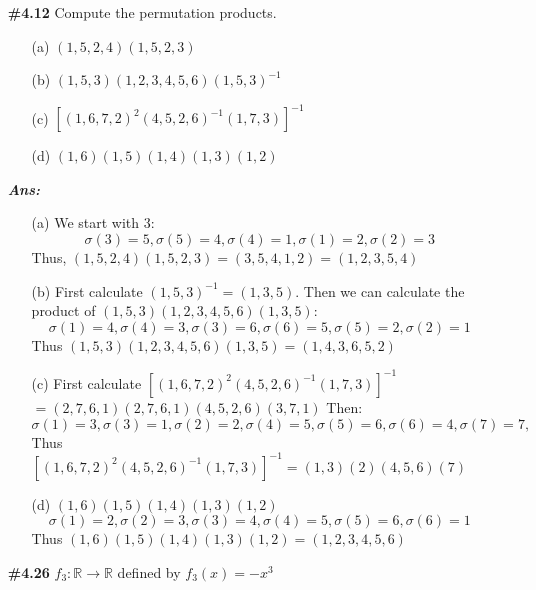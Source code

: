 \documentclass[12pt]{article}
\newcommand{\sol}{\setlength{\parindent}{0cm}\textbf{\textit{Ans:}}\setlength{\parindent}{1cm} }
\begin{document}
\begin{enumerate}[start=1,label={\bfseries Question \arabic*:},leftmargin=1in] %
  \item[\textbf{\#4.12}] Compute the permutation products.
  \begin{enumerate}
      \item[(a)] \( (1, 5, 2, 4)(1, 5, 2, 3) \)
      \item[(b)] \( (1, 5, 3)(1, 2, 3, 4, 5, 6)(1, 5, 3)^{-1} \)
      \item[(c)] \( [(1, 6, 7, 2)^2 (4, 5, 2, 6)^{-1} (1, 7, 3)]^{-1} \)
      \item[(d)] \( (1, 6)(1, 5)(1, 4)(1, 3)(1, 2) \)
  \end{enumerate}
  \sol{}
  \begin{enumerate}
    \item[(a)] We start with 3:
    \[\sigma(3) = 5, 
      \sigma(5) = 4, 
      \sigma(4) = 1, 
      \sigma(1) = 2, 
      \sigma(2) = 3
    \]
    Thus, \( (1, 5, 2, 4)(1, 5, 2, 3) = (3, 5, 4, 1, 2) = (1, 2, 3, 5, 4) \)
    \item[(b)] First calculate \( (1, 5, 3)^{-1} = (1, 3, 5) \). Then we can calculate the product of \( (1, 5, 3)(1, 2, 3, 4, 5, 6)(1, 3, 5) \):
    \[\sigma(1) = 4, 
    \sigma(4) = 3, 
    \sigma(3) = 6,
    \sigma(6) = 5, 
    \sigma(5) = 2,
    \sigma(2) = 1 
    \]
    Thus \( (1, 5, 3)(1, 2, 3, 4, 5, 6)(1, 3, 5) = (1, 4, 3, 6, 5, 2) \)
    \item[(c)] First calculate \( [(1, 6, 7, 2)^2 (4, 5, 2, 6)^{-1} (1, 7, 3)]^{-1}\) \\
    \( = (2, 7, 6, 1)(2, 7, 6, 1)(4, 5, 2, 6)(3, 7, 1) \) Then:
    \[\sigma(1) = 3,
    \sigma(3) = 1,
    \sigma(2) = 2,
    \sigma(4) = 5,
    \sigma(5) = 6,
    \sigma(6) = 4,
    \sigma(7) = 7,
    \]
    Thus \( [(1, 6, 7, 2)^2 (4, 5, 2, 6)^{-1} (1, 7, 3)]^{-1} = (1, 3)(2)(4, 5, 6)(7) \)
    \item[(d)] \( (1, 6)(1, 5)(1, 4)(1, 3)(1, 2) \)
    \[
    \sigma(1) = 2,
    \sigma(2) = 3,
    \sigma(3) = 4,
    \sigma(4) = 5,
    \sigma(5) = 6,
    \sigma(6) = 1
    \]
    Thus \( (1, 6)(1, 5)(1, 4)(1, 3)(1, 2) = (1, 2, 3, 4, 5, 6) \)
  \end{enumerate}
  \item[\textbf{\#4.26}] \( f_3 : \mathbb{R} \to \mathbb{R} \) defined by \( f_3(x) = -x^3 \)

\end{enumerate}
\end{document}
